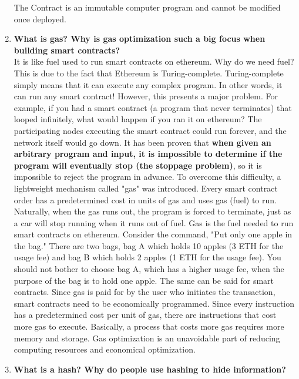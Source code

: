\documentclass[a4paper,10pt]{jsarticle}
\begin{document}
\begin{enumerate}
    The Contract is an immutable computer program and cannot be modified once deployed.
    \newline
    \item \textbf{\large{What is gas? Why is gas optimization such a big focus when building smart contracts?}}\mbox{}\\
    \newline
    It is like fuel used to run smart contracts on ethereum. Why do we need fuel? This is due to the fact that Ethereum is Turing-complete. Turing-complete simply means that it can execute any complex program. In other words, it can run any smart contract! However, this presents a major problem.
    For example, if you had a smart contract (a program that never terminates) that looped infinitely, what would happen if you ran it on ethereum? 
    The participating nodes executing the smart contract could run forever, and the network itself would go down. 
    It has been proven that \textbf{when given an arbitrary program and input, it is impossible to determine if the program will eventually stop (the stoppage problem)}, so it is impossible to reject the program in advance.
    To overcome this difficulty, a lightweight mechanism called "gas" was introduced.
    Every smart contract order has a predetermined cost in units of gas and uses gas (fuel) to run. Naturally, when the gas runs out, the program is forced to terminate, just as a car will stop running when it runs out of fuel. Gas is the fuel needed to run smart contracts on ethereum. 
    \newline
    Consider the command, "Put only one apple in the bag."
    There are two bags, bag A which holds 10 apples (3 ETH for the usage fee) and bag B which holds 2 apples (1 ETH for the usage fee).
    You should not bother to choose bag A, which has a higher usage fee, when the purpose of the bag is to hold one apple. The same can be said for smart contracts. 
    Since gas is paid for by the user who initiates the transaction, smart contracts need to be economically programmed. Since every instruction has a predetermined cost per unit of gas, there are instructions that cost more gas to execute. 
    Basically, a process that costs more gas requires more memory and storage.
    Gas optimization is an unavoidable part of reducing computing resources and economical optimization.
    \newline
    \item \textbf{\large{What is a hash? Why do people use hashing to hide information?}}\mbox{}\\

\end{enumerate}
\end{document}
